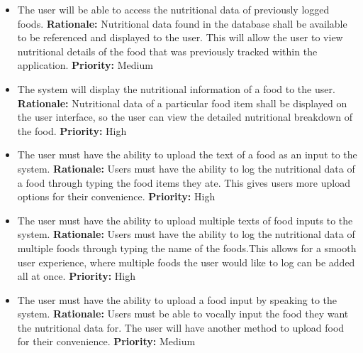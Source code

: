 \documentclass[12pt]{article}
\newcounter{FRCounter}
\newcommand{\FillFRNumber}{\textbf{FR\arabic{FRCounter}.} \stepcounter{FRCounter}}
\begin{document}
\begin{itemize}
	\item [\FillFRNumber] The user will be able to access the nutritional data of previously logged foods. \newline
	\textbf{Rationale:} Nutritional data found in the database shall be available to be referenced and displayed to the user. This will allow the user to view nutritional details of the food that was previously tracked within the application. \newline
	\textbf{Priority:} Medium
\end{itemize}

\begin{itemize}
	\item [\FillFRNumber] The system will display the nutritional information of a food to the user. \newline
	\textbf{Rationale:} Nutritional data of a particular food item shall be displayed on the user interface, so the user can view the detailed nutritional breakdown of the food.\newline
	\textbf{Priority:} High
\end{itemize}

\begin{itemize}
	\item [\FillFRNumber] The user must have the ability to upload the text of a food as an input to the system.\newline 
	\textbf{Rationale:} Users must have the ability to log the nutritional data of a food through typing the food items they ate. This gives users more upload options for their convenience.\newline
	\textbf{Priority:} High
\end{itemize}

\begin{itemize}
	\item [\FillFRNumber] The user must have the ability to upload multiple texts of food inputs to the system.\newline 
	\textbf{Rationale:} Users must have the ability to log the nutritional data of multiple foods through typing the name of the foods.This allows for a smooth user experience, where multiple foods the user would like to log can be added all at once.\newline
	\textbf{Priority:} High
\end{itemize}

\begin{itemize}
	\item [\FillFRNumber] The user must have the ability to upload a food input by speaking to the system.\newline 
	\textbf{Rationale:} Users must be able to vocally input the food they want the nutritional data for. The user will have another method to upload food for their convenience.\newline
	\textbf{Priority:} Medium
\end{itemize}
\end{document}
